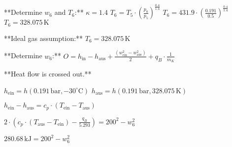 **Determine \( w_6 \) and \( T_6 \):**  
\( \kappa = 1.4 \)  
\( T_6 = T_5 \cdot \left( \frac{p_0}{p_5} \right)^{\frac{0.4}{1.4}} \)  
\( T_6 = 431.9 \cdot \left( \frac{0.191}{0.5} \right)^{\frac{0.4}{1.4}} \)  
\( T_6 = 328.075 \, \text{K} \)  

**Ideal gas assumption:**  
\( T_6 = 328.075 \, \text{K} \)  

**Determine \( w_6 \):**  
\( O = h_{\text{in}} - h_{\text{aus}} + \frac{(w_{\text{ein}}^2 - w_{\text{aus}}^2)}{2} + q_B \cdot \frac{1}{\dot{m}_K} \)  

**Heat flow is crossed out.**  

\( h_{\text{ein}} = h(0.191 \, \text{bar}, -30^\circ \text{C}) \)  
\( h_{\text{aus}} = h(0.191 \, \text{bar}, 328.075 \, \text{K}) \)  

\( h_{\text{ein}} - h_{\text{aus}} = c_p \cdot (T_{\text{ein}} - T_{\text{aus}}) \)  

\( 2 \cdot \left( c_p \cdot (T_{\text{aus}} - T_{\text{ein}}) - \frac{q_B}{5.293} \right) = 200^2 - w_6^2 \)  

\( 280.68 \, \text{kJ} = 200^2 - w_6^2 \)